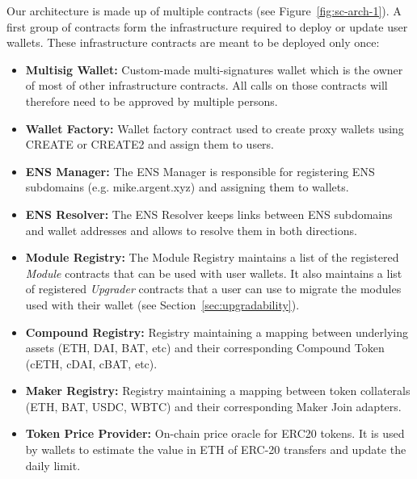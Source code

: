 \documentclass[12pt]{article}
\begin{document}
Our architecture is made up of multiple contracts (see Figure~\ref{fig:sc-arch-1}). A first group of contracts form the infrastructure required to deploy or update user wallets. These infrastructure contracts are meant to be deployed only once:
\begin{itemize}
    \item \textbf{Multisig Wallet:} Custom-made multi-signatures wallet which is the owner of most of other infrastructure contracts. All calls on those contracts will therefore need to be approved by multiple persons.
    \item \textbf{Wallet Factory:} Wallet factory contract used to create proxy wallets using CREATE or CREATE2 and assign them to users.
    \item \textbf{ENS Manager:} The ENS Manager is responsible for registering ENS subdomains (e.g. mike.argent.xyz) and assigning them to wallets.
    \item \textbf{ENS Resolver:} The ENS Resolver keeps links between ENS subdomains and wallet addresses and allows to resolve them in both directions.
    \item \textbf{Module Registry:} The Module Registry maintains a list of the registered \emph{Module} contracts that can be used with user wallets. It also maintains a list of registered \emph{Upgrader} contracts that a user can use to migrate the modules used with their wallet (see Section~\ref{sec:upgradability}).
    \item \textbf{Compound Registry:} Registry maintaining a mapping between underlying assets (ETH, DAI, BAT, etc) and their corresponding Compound Token (cETH, cDAI, cBAT, etc).
    \item \textbf{Maker Registry:} Registry maintaining a mapping between token collaterals (ETH, BAT, USDC, WBTC) and their corresponding Maker Join adapters.
    \item \textbf{Token Price Provider:} On-chain price oracle for ERC20 tokens. It is used by wallets to estimate the value in ETH of ERC-20 transfers and update the daily limit. 
\end{itemize}
\end{document}
